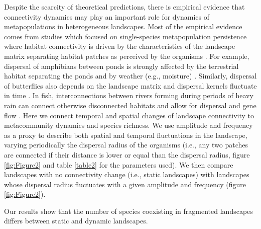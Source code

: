 \documentclass[a4paper,12pt]{article}
\begin{document}
Despite the scarcity of theoretical predictions, there is empirical evidence that connectivity dynamics may play an important role for dynamics of metapopulations in heterogeneous landscapes. Most of the empirical evidence comes from studies which focused on single-species metapopulation persistence where habitat connectivity is driven by the characteristics of the landscape matrix separating habitat patches as perceived by the organisms \citep{EycottEtAl2012}. For example, dispersal of amphibians between ponds is strongly affected by the terrestrial habitat separating the ponds \citep{VanBuskirk2012, ClineHunter2014} and by weather (e.g., moisture) \citep{RittenhouseEtAl2009}. Similarly, dispersal of butterflies also depends on the landscape matrix \citep{KueflerEtAl2010} and dispersal kernels fluctuate in time \citep{SchtickzelleEtAl2012}. In fish, interconnections between rivers forming during periods of heavy rain can connect otherwise disconnected habitats and allow for dispersal and gene flow \citep{BoizardEtAl2009}. Here we connect temporal and spatial changes of landscape connectivity to metacommunity dynamics and species richness. We use amplitude and frequency as a proxy to describe both spatial and temporal fluctuations in the landscape, varying periodically the dispersal radius of the organisms (i.e., any two patches are connected if their distance is lower or equal than the dispersal radius, figure \ref{fig:Figure2} and table \ref{table2} for the parameters used). We then compare landscapes with no connectivity change (i.e., static landscapes) with landscapes whose dispersal radius fluctuates with a given amplitude and frequency (figure \ref{fig:Figure2}). 

Our results show that the number of species coexisting in fragmented landscapes differs between static and dynamic landscapes. 

\end{document}
